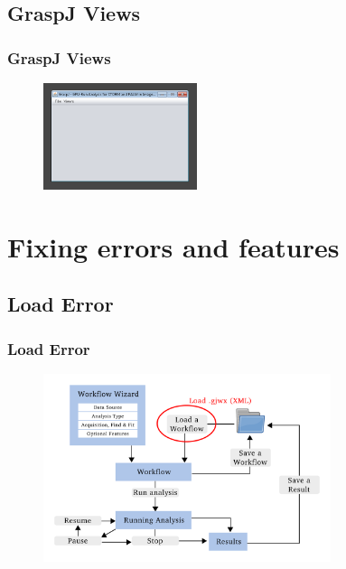 \documentclass[aspectratio=169]{beamer}
\begin{document}
\subsection{GraspJ Views}
\frametitle{GraspJ Views}

\begin{frame}

\begin{figure}[h!]
    \centering	\includegraphics[width=0.4\textwidth]{./images/graspj.png} 
    \caption{}
    \label{fig:graspj}
    \end{figure} 
 
\end{frame}

\section{Fixing errors and features}

\subsection{Load Error}
\begin{frame}
\frametitle{Load Error}
\begin{figure}[h!]
    \centering	\includegraphics[width=0.75\textwidth]{./images/load_error.pdf} 
    \end{figure} 
 
\end{frame}
\end{document}
